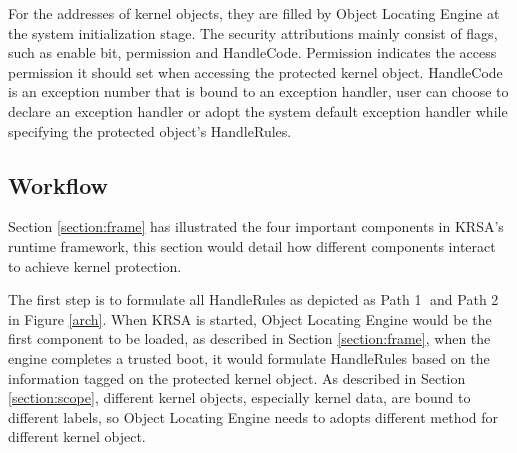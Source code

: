 \documentclass[conference]{IEEEtran}
\begin{document}


For the addresses of kernel objects, they are filled by Object Locating Engine at the system initialization stage. The security attributions mainly consist of flags, such as enable bit, permission and HandleCode. Permission indicates the access permission it should set when accessing the protected kernel object. HandleCode is an exception number that is bound to an exception handler, user can choose to declare an exception handler or adopt the system default exception handler while specifying the protected object's HandleRules. 

\subsection{Workflow} \label{section:workflow}
Section \ref{section:frame} has illustrated the four important components in KRSA's runtime framework, this section would detail how different components interact to achieve kernel protection. 

The first step is to formulate all HandleRules as depicted as Path \textcircled{1} and Path \textcircled{2} in Figure \ref{arch}.  When KRSA is started, Object Locating Engine would be the first component to be loaded, as described in Section \ref{section:frame}, when the engine completes a trusted boot, it would formulate HandleRules based on the information tagged on the protected kernel object. 
As described in Section \ref{section:scope}, different kernel objects, especially kernel data, are bound to different labels, so Object Locating Engine needs to adopts different method for different kernel object.
\end{document}

